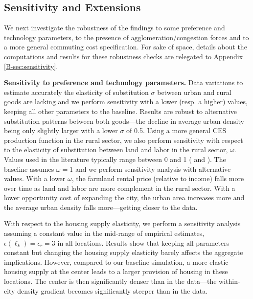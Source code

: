 \documentclass[./20250130-paper.tex]{subfiles}
\begin{document}
\subsection{Sensitivity and Extensions}\label{sec:extensions}


We next investigate the robustness of the findings to some preference and technology parameters, to the presence of agglomeration/congestion forces and to a more general commuting cost specification. For sake of space,  details about the computations and results for these robustness checks are relegated to Appendix \ref{B-sec:sensitivity}.

\textbf{Sensitivity to preference and technology parameters.} Data variations to estimate accurately the elasticity of substitution $\sigma$ between urban and rural goods are lacking and we perform sensitivity with a lower (resp. a higher) values, keeping all other parameters to the baseline. Results are robust to alternative substitution patterns between both goods---the decline in average urban density being only slightly larger with a lower $\sigma$ of 0.5. Using a more general CES production function in the rural sector, we also perform sensitivity with respect to the elasticity of substitution between land and labor in the rural sector, $\omega$. Values used in the literature typically range between 0 and 1 (\cite{bustosetal2016} and \cite{leukhinaturnovsky2016}). The baseline assumes $\omega=1$ and we perform sensitivity analysis with alternative values. With a lower $\omega$, the farmland rental price (relative to income) falls more over time as land and labor are more complement in the rural sector. With a lower opportunity cost of expanding the city, the urban area increases more and the average urban density falls more---getting closer to the data.

With respect to the housing supply elasticity, we perform a sensitivity analysis assuming a constant value in the mid-range of empirical estimates, $\epsilon(\ell_k) = \epsilon_r = 3$ in all locations. Results show that keeping all parameters constant but changing the housing supply elasticity barely affects the aggregate implications. However, compared to our baseline simulation, a more elastic housing supply at the center leads to a larger provision of housing in these locations. The center is then significantly denser than in the data---the within-city density gradient becomes significantly steeper than in the data.
\end{document}
